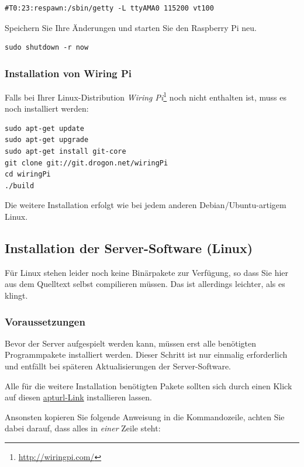 \documentclass[10pt,a4paper]{scrartcl}		%
\begin{document}
\begin{verbatim}
#T0:23:respawn:/sbin/getty -L ttyAMA0 115200 vt100
\end{verbatim}

Speichern Sie Ihre Änderungen und starten Sie den Raspberry Pi neu.

\begin{verbatim}
sudo shutdown -r now
\end{verbatim}

\subsubsection*{Installation von Wiring Pi}
Falls bei Ihrer Linux-Distribution \textit{Wiring Pi}\footnote{\url{http://wiringpi.com/}} 
noch nicht enthalten ist, muss es noch installiert werden:

\begin{verbatim}
sudo apt-get update
sudo apt-get upgrade
sudo apt-get install git-core
git clone git://git.drogon.net/wiringPi
cd wiringPi
./build
\end{verbatim}

Die weitere Installation erfolgt wie bei jedem anderen Debian/Ubuntu-artigem Linux.

\label{serverinst}
\subsection{Installation der Server-Software (Linux)}
Für Linux stehen leider noch keine Binärpakete zur Verfügung,
so dass Sie hier aus dem Quelltext selbst compilieren müssen.
Das ist allerdings leichter, als es klingt.

\subsubsection{Voraussetzungen}
Bevor der Server aufgespielt werden kann, müssen erst alle
benötigten Programmpakete installiert werden. Dieser Schritt ist nur
einmalig erforderlich und entfällt bei späteren Aktualisierungen
der Server-Software.

Alle für die weitere Installation benötigten Pakete sollten
sich durch einen Klick auf diesen 
\href{apt://build-essential,gcc-avr,avr-libc,avrdude,avrdude-doc,libcurl4-gnutls-dev,git}{apturl-Link} installieren lassen.

Ansonsten kopieren Sie folgende Anweisung in die Kommandozeile, 
achten Sie dabei darauf, dass alles in \textit{einer} Zeile steht:
\end{document}
